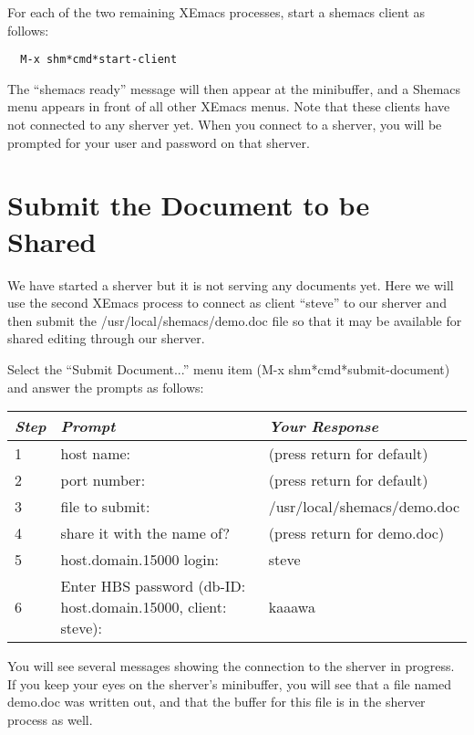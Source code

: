 For each of the two remaining XEmacs processes, start a shemacs client
as follows:
	
\small\begin{verbatim}
  M-x shm*cmd*start-client
\end{verbatim}\normalsize

The ``shemacs ready'' message will then appear at the minibuffer, and a Shemacs 
menu appears in front of all other XEmacs menus.  Note that these 
clients have not connected to any sherver yet.  When you connect to a sherver, 
you will be prompted for your user and password on that sherver.

\section{Submit the Document to be Shared}

We have started a sherver but it is not serving any documents yet.  Here we
will use the second XEmacs process to connect as client ``steve'' to our
sherver and then submit the /usr/local/shemacs/demo.doc file so that it may
be available for shared editing through our sherver.

Select the ``Submit Document...'' menu item (M-x shm*cmd*submit-document)
and answer the prompts as follows:

\small
\begin{center}
\begin{tabular} {|l|l|l|} \hline
{\em Step} & {\em Prompt}  & {\em Your Response} \\ \hline
1 & host name: & (press return for default) \\
2 & port number: & (press return for default) \\
3 & file to submit: & /usr/local/shemacs/demo.doc \\
4 & share it with the name of?  & (press return for demo.doc) \\
5 & host.domain.15000 login: & steve \\
6 & Enter HBS password (db-ID: host.domain.15000, client: steve): & kaaawa \\
\hline
\end{tabular}
\end{center}
\normalsize

You will see several messages showing the connection to the sherver in 
progress.  If you keep your eyes on the sherver's minibuffer, you will see 
that a file named demo.doc was written out, and that the buffer for this file 
is in the sherver process as well.

